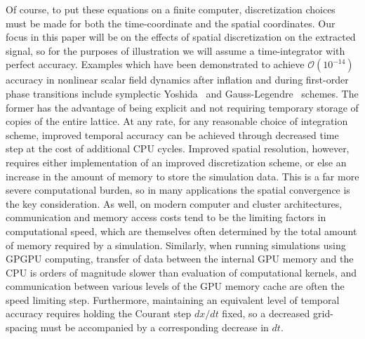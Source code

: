 \documentclass{revtex4}
\begin{document}
Of course, to put these equations on a finite computer, discretization choices must be made for both the time-coordinate and the spatial coordinates.
Our focus in this paper will be on the effects of spatial discretization on the extracted signal, so for the purposes of illustration we will assume a time-integrator with perfect accuracy.
Examples which have been demonstrated to achieve $\mathcal{O}(10^{-14})$ accuracy in nonlinear scalar field dynamics after inflation and during first-order phase transitions include symplectic Yoshida~\cite{} and Gauss-Legendre~\cite{} schemes.
The former has the advantage of being explicit and not requiring temporary storage of copies of the entire lattice.
At any rate, for any reasonable choice of integration scheme, improved temporal accuracy can be achieved through decreased time step at the cost of additional CPU cycles.
Improved spatial resolution, however, requires either implementation of an improved discretization scheme, or else an increase in the amount of memory to store the simulation data.
This is a far more severe computational burden, so in many applications the spatial convergence is the key consideration.
As well, on modern computer and cluster architectures, communication and memory access costs tend to be the limiting factors in computational speed, which are themselves often determined by the total amount of memory required by a simulation.
Similarly, when running simulations using GPGPU computing, transfer of data between the internal GPU memory and the CPU is orders of magnitude slower than evaluation of computational kernels, and communication between various levels of the GPU memory cache are often the speed limiting step.
Furthermore, maintaining an equivalent level of temporal accuracy requires holding the Courant step $dx/dt$ fixed, so a decreased grid-spacing must be accompanied by a corresponding decrease in $dt$. 
\end{document}
